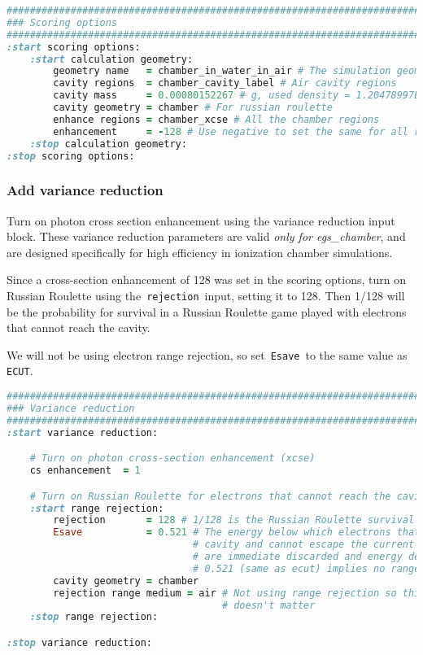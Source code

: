 \documentclass[12pt,twoside]{article}
\begin{document}
{\small
\begin{lstlisting}[language=ruby,backgroundcolor=\color{white}]
##############################################################################
### Scoring options
##############################################################################
:start scoring options:
    :start calculation geometry:
        geometry name   = chamber_in_water_in_air # The simulation geometry
        cavity regions  = chamber_cavity_label # Air cavity regions
        cavity mass     = 0.00080152267 # g, used density = 1.20478997E-03 g/cm^3
        cavity geometry = chamber # For russian roulette
        enhance regions = chamber_xcse # All the chamber regions
        enhancement     = -128 # Use negative to set the same for all regions
    :stop calculation geometry:
:stop scoring options:
\end{lstlisting}
}


\subsubsection{Add variance reduction}
Turn on photon cross section enhancement using the variance reduction input
block.  These variance reduction parameters are valid
\textit{only for egs\_chamber}, and are designed specifically for high
efficiency in ionization chamber simulations.

Since a cross-section enhancement of 128 was set in the scoring options, turn
on Russian Roulette using the \,\Verb|rejection|\, input, setting it to 128.
Then 1/128 will be the probability for survival in a Russian Roulette game
played with electrons that cannot reach the cavity.

We will not be using electron range rejection, so set \,\Verb|Esave|\, to
the same value as \,\Verb|ECUT|.

{\small
\begin{lstlisting}[language=ruby,backgroundcolor=\color{white}]
##############################################################################
### Variance reduction
##############################################################################
:start variance reduction:

    # Turn on photon cross-section enhancement (xcse)
    cs enhancement  = 1

    # Turn on Russian Roulette for electrons that cannot reach the cavity
    :start range rejection:
        rejection       = 128 # 1/128 is the Russian Roulette survival probability
        Esave           = 0.521 # The energy below which electrons that are in the
                                # cavity and cannot escape the current region
                                # are immediate discarded and energy deposited
                                # 0.521 (same as ecut) implies no range rejection
        cavity geometry = chamber
        rejection range medium = air # Not using range rejection so this
                                     # doesn't matter
    :stop range rejection:

:stop variance reduction:
\end{lstlisting}
}
\end{document}
